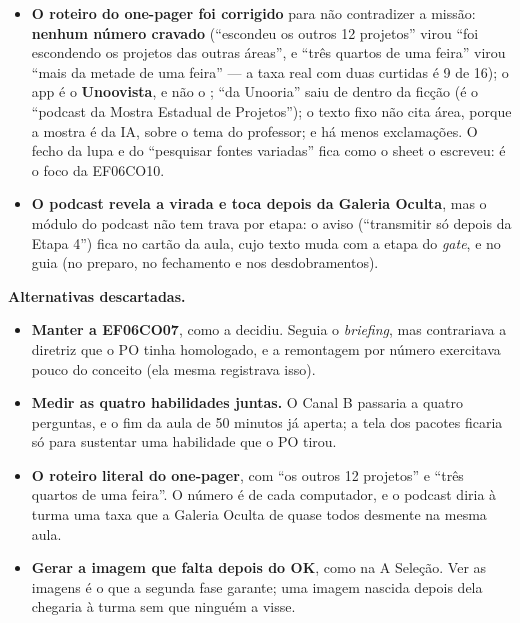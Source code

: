 \begin{itemize}
{    mesa\}} e as grava em  na mesma transação, também no
    segundo clique.
  \item \textbf{O roteiro do one-pager foi corrigido} para não contradizer a
    missão: \textbf{nenhum número cravado} (\enquote{escondeu os outros 12
    projetos} virou \enquote{foi escondendo os projetos das outras áreas}, e
    \enquote{três quartos de uma feira} virou \enquote{mais da metade de uma
    feira} --- a taxa real com duas curtidas é 9 de 16); o app é o
    \textbf{Unoovista}, e não o ; \enquote{da Unooria} saiu de
    dentro da ficção (é o \enquote{podcast da Mostra Estadual de Projetos});
    o texto fixo não cita área, porque a mostra é da IA, sobre o tema do
    professor; e há menos exclamações. O fecho da lupa e do
    \enquote{pesquisar fontes variadas} fica como o sheet o escreveu: é o
    foco da EF06CO10.
  \item \textbf{O podcast revela a virada e toca depois da Galeria Oculta},
    mas o módulo do podcast não tem trava por etapa: o aviso
    (\enquote{transmitir só depois da Etapa 4}) fica no cartão da aula, cujo
    texto muda com a etapa do \emph{gate}, e no guia (no preparo, no
    fechamento e nos desdobramentos).
\end{itemize}

\textbf{Alternativas descartadas.}

\begin{itemize}
  \item \textbf{Manter a EF06CO07}, como a  decidiu. Seguia o
    \emph{briefing}, mas contrariava a diretriz que o PO tinha homologado, e a
    remontagem por número exercitava pouco do conceito (ela mesma registrava
    isso).
  \item \textbf{Medir as quatro habilidades juntas.} O Canal B passaria a
    quatro perguntas, e o fim da aula de 50 minutos já aperta; a tela dos
    pacotes ficaria só para sustentar uma habilidade que o PO tirou.
  \item \textbf{O roteiro literal do one-pager}, com \enquote{os outros 12
    projetos} e \enquote{três quartos de uma feira}. O número é de cada
    computador, e o podcast diria à turma uma taxa que a Galeria Oculta de
    quase todos desmente na mesma aula.
  \item \textbf{Gerar a imagem que falta depois do OK}, como na A Seleção. Ver
    as imagens é o que a segunda fase garante; uma imagem nascida depois dela
    chegaria à turma sem que ninguém a visse.
\end{itemize}

